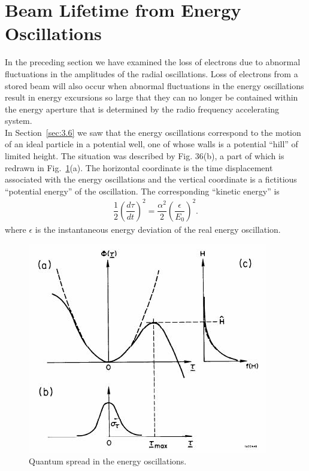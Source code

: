 \section{Beam Lifetime from Energy Oscillations} \label{eq:5.8}

In the preceding section we have examined the loss of electrons due to abnormal fluctuations in the amplitudes of the radial oscillations. Loss of electrons from a stored beam will also occur when abnormal fluctuations in the energy oscillations result in energy excursions so large that they can no longer be contained within the energy aperture that is determined by the radio frequency accelerating system.\\
In Section~\ref{sec:3.6} we saw that the energy oscillations correspond to the motion of an ideal particle in a potential well, one of whose walls is a potential ``hill'' of limited height. The situation was described by Fig. 36(b), a part of which is redrawn in Fig.~\ref{fig:fig48}(a). The horizontal coordinate is the time displacement associated with the energy oscillations and the vertical coordinate is a fictitious ``potential energy'' of the oscillation. The corresponding ``kinetic energy'' is
\begin{align} \label{eq:5.131}
	\dfrac{1}{2}\left( \dfrac{d\tau}{dt} \right)^2 = \dfrac{\alpha^2}{2} \left( \dfrac{\epsilon}{E_0} \right)^2.
\end{align}
where $\epsilon$ is the instantaneous energy deviation of the real energy oscillation.

\begin{figure}[!htb]
	\centering
	\includegraphics[width=0.8\linewidth]{./Figuras/fig48.jpeg}
	\caption{Quantum spread in the energy oscillations.}
	\label{fig:fig48}
\end{figure}

